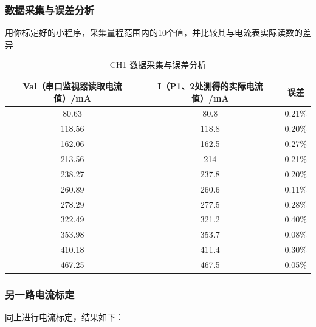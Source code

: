 \documentclass[10.5pt]{config}
\begin{document}
\subsubsection{数据采集与误差分析}
用你标定好的小程序，采集量程范围内的10个值，并比较其与电流表实际读数的差异
\begin{table}[H]
  \centering
    \begin{tabular}{|c|c|c|}
    \hline
    \multicolumn{1}{|p{15.065em}|}{Val（串口监视器读取电流值）/mA} & \multicolumn{1}{p{15em}|}{I（P1、2处测得的实际电流值）/mA} & \multicolumn{1}{p{2.235em}|}{误差} \bigstrut\\
    \hline
    80.63 & 80.8  & 0.21\% \bigstrut\\
    \hline
    118.56 & 118.8 & 0.20\% \bigstrut\\
    \hline
    162.06 & 162.5 & 0.27\% \bigstrut\\
    \hline
    213.56 & 214   & 0.21\% \bigstrut\\
    \hline
    238.27 & 237.8 & 0.20\% \bigstrut\\
    \hline
    260.89 & 260.6 & 0.11\% \bigstrut\\
    \hline
    278.29 & 277.5 & 0.28\% \bigstrut\\
    \hline
    322.49 & 321.2 & 0.40\% \bigstrut\\
    \hline
    353.98 & 353.7 & 0.08\% \bigstrut\\
    \hline
    410.18 & 411.4 & 0.30\% \bigstrut\\
    \hline
    467.25 & 467.5 & 0.05\% \bigstrut\\
    \hline
    \end{tabular}%
  \caption{CH1 数据采集与误差分析}
  \label{tab:addlabel}%
\end{table}%
\subsubsection{另一路电流标定}
同上进行电流标定，结果如下：
\end{document}
